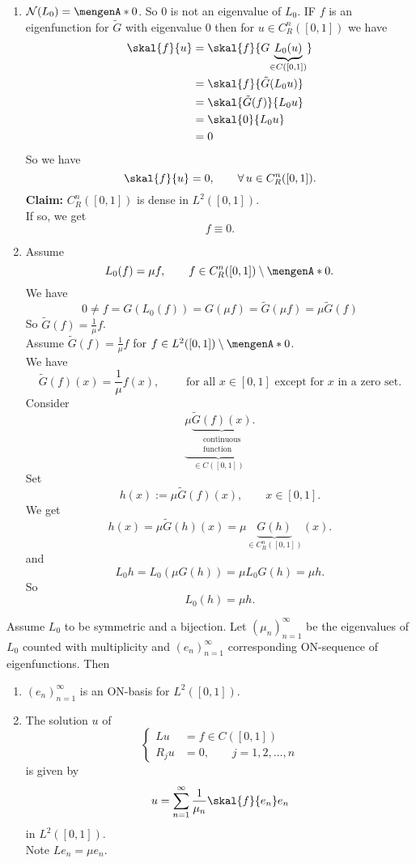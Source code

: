 \begin{beweis}
	\begin{enumerate}
		\item $\mathcal{N}(L_0)= \set{0}$. So $0$ is not an eigenvalue of $L_0$. IF $f$ is an eigenfunction for $\tilde G$ with eigenvalue $0$ then for $u \in C_R^n([0,1])$ we have
		\begin{align*}
			\skal{f}{u} &= \skal{f}{G \underset{\in  C([0,1])}{\underbrace{L_0(u)}}} \\ & = \skal{f}{\tilde G(L_0u)}  \\ &= \skal{\tilde G(f)}{L_0u} \\
			&= \skal{0}{L_0u}  \\ &=0
 		\end{align*}
		So we have
		\[
			\skal{f}{u}= 0, \qquad \forall\, u \in C_R^n([0,1]).
		\]
		\textbf{Claim:} \text{    }$C_R^n([0,1])$ is dense in $L^2([0,1])$. \\
		If so, we get
		\[
			f \equiv 0.
		\]
		\item Assume
		\[
			L_0(f) = \mu f, \qquad f \in C_R^n([0,1]) \setminus \set{0}.
		\]
		We have
		\[
			0 \neq f = G(L_0(f)) = G( \mu f) = \tilde G( \mu f) = \mu \tilde G(f)
		\]
		So $\tilde G(f) = \frac{1}{\mu}f$. \\
		Assume $\tilde G(f) = \frac{1}{\mu} f$ for $f \in L^2([0,1]) \setminus \set{0}$. \\
		We have 
		\[
			\tilde G(f)(x) = \frac{1}{\mu}f(x), \qquad \text{ for all }x \in  [0,1] \text{ except for $x$ in a zero set.}
		\]
		Consider
		\[
			\underset{\in C([0,1])}{\underbrace{\mu \underset{\substack{\text{continuous} \\ \text{function}}}{\underbrace{\tilde G(f)(x)}}}}.
		\]
		Set 
		\[
			h(x):= \mu \tilde G(f)(x), \qquad  x \in  [0,1].
		\]
		We get
		\[
			h(x) = \mu \tilde G(h)(x) = \mu \underset{\in C^n_R([0,1])}{\underbrace{G(h)}}(x).
		\]
		and
		\[
			L_0h= L_0( \mu G(h)) = \mu L_0G(h) = \mu h.
		\]
		So
		\[
			L_0(h) = \mu h.
		\]
	\end{enumerate}
\end{beweis}
\begin{theorem}
	Assume $L_0$ to be symmetric and a bijection. Let $(\mu_n)_{n=1}^{\infty}$ be the eigenvalues of $L_0$ counted with multiplicity and $(e_n)_{n=1}^{\infty}$ corresponding ON-sequence of eigenfunctions. Then
	\begin{enumerate}
		\item $(e_n)_{n=1}^{\infty}$ is an ON-basis for $L^2([0,1])$.
		\item The solution $u$ of 
		\[
			\begin{cases}
				Lu &= f \in C([0,1]) \\
				R_ju &=0, \qquad j= 1,2,\dots,n
			\end{cases}
		\]
		is given by
		\[
			u = \sum_{n=1}^{\infty} \frac{1}{\mu_n} \skal{f}{e_n}e_n 
		\]
		in $L^2([0,1])$. \\
		Note $Le_n = \mu e_n$.
	\end{enumerate}
\end{theorem}


